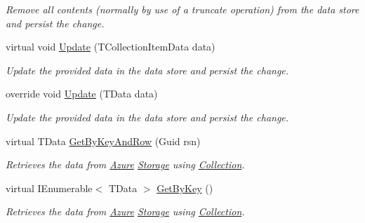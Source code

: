 \begin{DoxyCompactItemize}
\begin{DoxyCompactList}\small\item\em Remove all contents (normally by use of a truncate operation) from the data store and persist the change. \end{DoxyCompactList}\item 
virtual void \hyperlink{classCqrs_1_1Azure_1_1BlobStorage_1_1TableStorageStore_aacb673aed5c6f828917f4d2e8c2ff75b_aacb673aed5c6f828917f4d2e8c2ff75b}{Update} (T\+Collection\+Item\+Data data)
\begin{DoxyCompactList}\small\item\em Update the provided {\itshape data}  in the data store and persist the change. \end{DoxyCompactList}\item 
override void \hyperlink{classCqrs_1_1Azure_1_1BlobStorage_1_1TableStorageStore_a869eba77358b10fc298f8e13fb21d628_a869eba77358b10fc298f8e13fb21d628}{Update} (T\+Data data)
\begin{DoxyCompactList}\small\item\em Update the provided {\itshape data}  in the data store and persist the change. \end{DoxyCompactList}\item 
virtual T\+Data \hyperlink{classCqrs_1_1Azure_1_1BlobStorage_1_1TableStorageStore_ab7c4ae1a7b13e6bd1c36c242b753edba_ab7c4ae1a7b13e6bd1c36c242b753edba}{Get\+By\+Key\+And\+Row} (Guid rsn)
\begin{DoxyCompactList}\small\item\em Retrieves the data from \hyperlink{namespaceCqrs_1_1Azure}{Azure} \hyperlink{namespaceCqrs_1_1Azure_1_1Storage}{Storage} using \hyperlink{classCqrs_1_1Azure_1_1BlobStorage_1_1TableStorageStore_a97752ec9c5ad130a230924da9a75a537_a97752ec9c5ad130a230924da9a75a537}{Collection}. \end{DoxyCompactList}\item 
virtual I\+Enumerable$<$ T\+Data $>$ \hyperlink{classCqrs_1_1Azure_1_1BlobStorage_1_1TableStorageStore_a7a6e253d7d4f6d40a2b59e804f68c5c4_a7a6e253d7d4f6d40a2b59e804f68c5c4}{Get\+By\+Key} ()
\begin{DoxyCompactList}\small\item\em Retrieves the data from \hyperlink{namespaceCqrs_1_1Azure}{Azure} \hyperlink{namespaceCqrs_1_1Azure_1_1Storage}{Storage} using \hyperlink{classCqrs_1_1Azure_1_1BlobStorage_1_1TableStorageStore_a97752ec9c5ad130a230924da9a75a537_a97752ec9c5ad130a230924da9a75a537}{Collection}. \end{DoxyCompactList}\end{DoxyCompactItemize}
